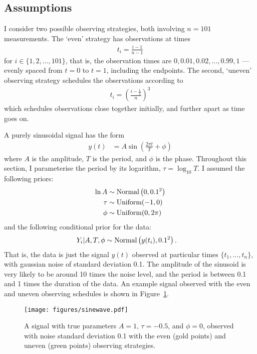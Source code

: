 \documentclass[entropy,article,accept,oneauthor,pdftex,10pt,a4paper]{mdpi}
\begin{document}
\subsection{Assumptions}

I consider two possible observing strategies, both involving
$n=101$ measurements. The `even' strategy has observations at times
\begin{align}
t_i = \frac{i-1}{n-1}
\end{align}
for $i \in \{1, 2, ..., 101\}$, that is, the observation times are
$0, 0.01, 0.02, ..., 0.99, 1$ ---
evenly spaced from $t=0$ to $t=1$, including the endpoints.
The second, `uneven' observing strategy schedules the observations
according to
\begin{align}
t_i = \left(\frac{i - \frac{1}{2}}{n}\right)^3
\end{align}
which schedules observations close together initially, and further apart
as time goes on.

A purely sinusoidal signal has the form
\begin{align}
y(t) &= A \sin \left(\frac{2\pi t}{T} + \phi\right)
\end{align}
where $A$ is the amplitude, $T$ is the period, and $\phi$ is the phase.
Throughout this section, I parameterise the period by its logarithm,
$\tau = \log_{10} T$. I assumed the following priors:
\begin{align}
\ln A   &\sim \textnormal{Normal}\left(0, 0.1^2\right)  \\
\tau    &\sim \textnormal{Uniform}(-1, 0)  \\
\phi    &\sim \textnormal{Uniform}(0, 2\pi)
\end{align}
and the following conditional prior for the data:
\begin{align}
Y_i | A, T, \phi &\sim \textnormal{Normal}\left(y(t_i), 0.1^2\right).
\end{align}
That is, the data is just the signal $y(t)$ observed at particular times
$\{t_1, ..., t_n\}$, with gaussian noise of standard deviation 0.1.
The amplitude of the sinusoid is very likely to be around 10 times the
noise level, and the period is between 0.1 and 1 times the duration of
the data. An example signal observed with the even and uneven observing schedules
is shown in Figure~\ref{fig:sinewave}.

\begin{figure}[!ht]
\centering
\texttt{[image: figures/sinewave.pdf]}
\caption{A signal with true parameters $A=1$, $\tau=-0.5$, and
$\phi=0$, observed with noise standard deviation 0.1 with the
even (gold points) and uneven (green points) observing strategies.
\label{fig:sinewave}}
\end{figure}
\end{document}
